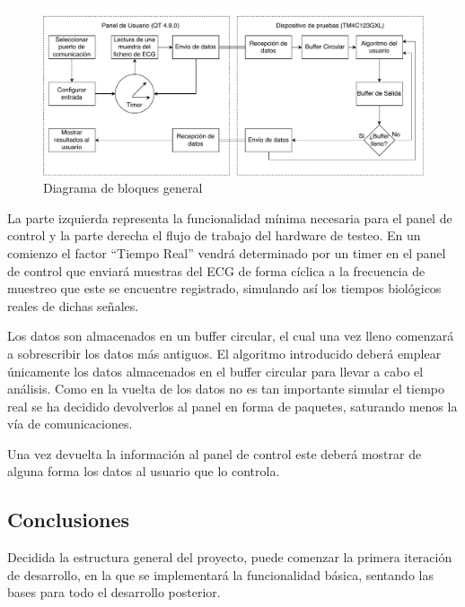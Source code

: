         \begin{figure}[H]  
            \centering
                \includegraphics[width =\linewidth]{figuras/InternBlockDiagram.pdf}
                \caption{Diagrama de bloques general}
                \label{fig:InternalBlocksDiagram}
        \end{figure}
 
        La parte izquierda representa la funcionalidad mínima necesaria para el panel de control y la parte derecha el flujo de trabajo del hardware de testeo. En un comienzo el factor “Tiempo Real” vendrá determinado por un timer en el panel de control que enviará muestras del ECG de forma cíclica a la frecuencia de muestreo que este se encuentre registrado, simulando así los tiempos biológicos reales de dichas señales. 
        
        Los datos son almacenados en un buffer circular, el cual una vez lleno comenzará a sobrescribir los datos más antiguos. El algoritmo introducido deberá emplear únicamente los datos almacenados en el buffer circular para llevar a cabo el análisis. Como en la vuelta de los datos no es tan importante simular el tiempo real se ha decidido devolverlos al panel en forma de paquetes, saturando menos la vía de comunicaciones.
        
        Una vez devuelta la información al panel de control este deberá mostrar de alguna forma los datos al usuario que lo controla.        

        \subsection{Conclusiones}

        Decidida la estructura general del proyecto, puede comenzar la primera iteración de desarrollo, en la que se implementará la funcionalidad básica, sentando las bases para todo el desarrollo posterior.